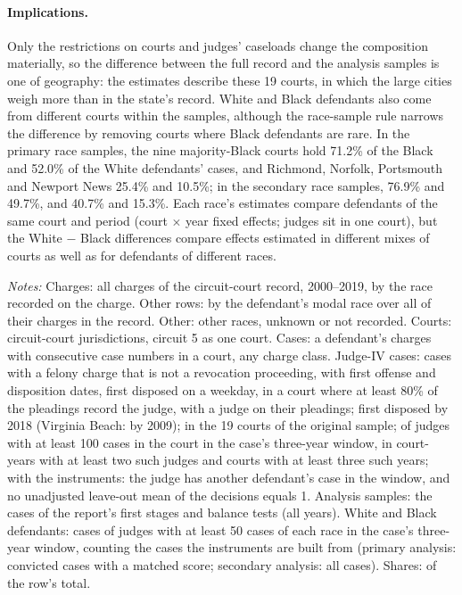 \documentclass[11pt]{article}
\newcommand{\tabnote}[1]{\par\vspace{0.6ex}\begin{minipage}{\linewidth}\linespread{1}\footnotesize\textit{Notes:} #1\end{minipage}}
\newcommand{\racesamplenote}{White and Black defendants: cases of judges with at least 50 cases of each race in the case's three-year window, counting the cases the instruments are built from (primary analysis: convicted cases with a matched score; secondary analysis: all cases).}
\begin{document}
\paragraph{Implications.} Only the restrictions on courts and judges' caseloads change the composition materially, so the difference between the full record and the analysis samples is one of geography: the estimates describe these 19 courts, in which the large cities weigh more than in the state's record. White and Black defendants also come from different courts within the samples, although the race-sample rule narrows the difference by removing courts where Black defendants are rare. In the primary race samples, the nine majority-Black courts hold 71.2\% of the Black and 52.0\% of the White defendants' cases, and Richmond, Norfolk, Portsmouth and Newport News 25.4\% and 10.5\%; in the secondary race samples, 76.9\% and 49.7\%, and 40.7\% and 15.3\%. Each race's estimates compare defendants of the same court and period (court $\times$ year fixed effects; judges sit in one court), but the White $-$ Black differences compare effects estimated in different mixes of courts as well as for defendants of different races.

\begin{table}[H]
\centering
\caption{Race of the defendants at each step of the sample}\label{tab:race_steps}
{\small\renewcommand{\arraystretch}{0.9}\resizebox{\textwidth}{!}{}}
\tabnote{Charges: all charges of the circuit-court record, 2000--2019, by the race recorded on the charge. Other rows: by the defendant's modal race over all of their charges in the record. Other: other races, unknown or not recorded. Courts: circuit-court jurisdictions, circuit 5 as one court. Cases: a defendant's charges with consecutive case numbers in a court, any charge class. Judge-IV cases: cases with a felony charge that is not a revocation proceeding, with first offense and disposition dates, first disposed on a weekday, in a court where at least 80\% of the pleadings record the judge, with a judge on their pleadings; first disposed by 2018 (Virginia Beach: by 2009); in the 19 courts of the original sample; of judges with at least 100 cases in the court in the case's three-year window, in court-years with at least two such judges and courts with at least three such years; with the instruments: the judge has another defendant's case in the window, and no unadjusted leave-out mean of the decisions equals 1. Analysis samples: the cases of the report's first stages and balance tests (all years). \racesamplenote{} Shares: of the row's total.}
\end{table}
\end{document}
